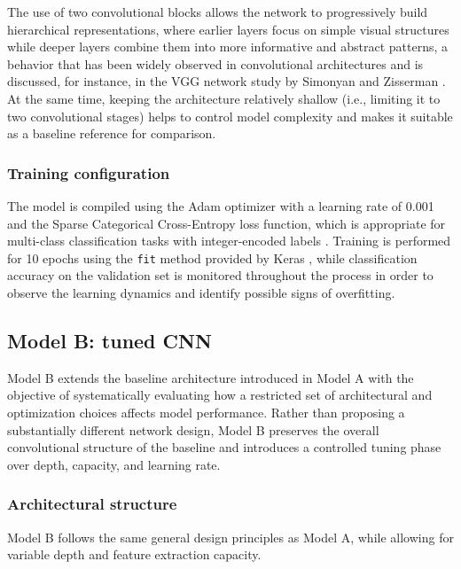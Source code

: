 \documentclass[11pt,a4paper]{article}
\begin{document}
The use of two convolutional blocks allows the network to progressively build hierarchical representations, where earlier layers focus on simple visual structures while deeper layers combine them into more informative and abstract patterns, a behavior that has been widely observed in convolutional architectures and is discussed, for instance, in the VGG network study by Simonyan and Zisserman \cite{simonyan2015vgg}. At the same time, keeping the architecture relatively shallow (i.e., limiting it to two convolutional stages) helps to control model complexity and makes it suitable as a baseline reference for comparison.

\subsubsection{Training configuration}

The model is compiled using the Adam optimizer \cite{keras_optimizers} with a learning rate of 0.001 and the Sparse Categorical Cross-Entropy loss function, which is appropriate for multi-class classification tasks with integer-encoded labels \cite{keras_losses}. Training is performed for 10 epochs using the \texttt{fit} method provided by Keras \cite{keras_model_fit}, while classification accuracy on the validation set is monitored throughout the process in order to observe the learning dynamics and identify possible signs of overfitting.


\subsection{Model B: tuned CNN}

Model B extends the baseline architecture introduced in Model A with the objective of systematically evaluating how a restricted set of architectural and optimization choices affects model performance.  
Rather than proposing a substantially different network design, Model B preserves the overall convolutional structure of the baseline and introduces a controlled tuning phase over depth, capacity, and learning rate.

\subsubsection{Architectural structure}

Model B follows the same general design principles as Model A, while allowing for variable depth and feature extraction capacity.  
\end{document}
